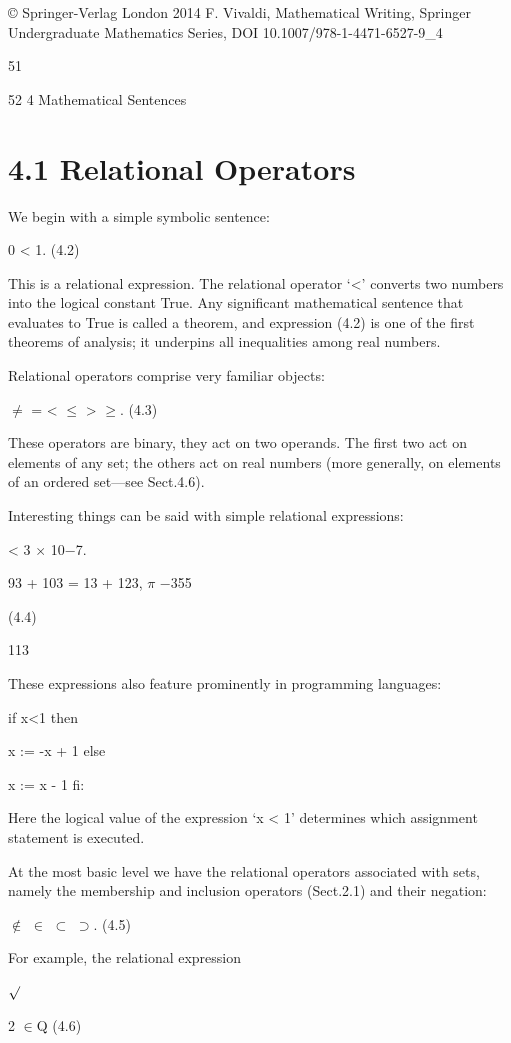 \documentclass[11pt]{article}
\theoremstyle{plain}
\theoremstyle{definition}
\begin{document}
© Springer-Verlag London 2014 F. Vivaldi, Mathematical Writing, Springer Undergraduate Mathematics Series, DOI 10.1007/978-1-4471-6527-9\_4

51

52 4 Mathematical Sentences

\section{4.1 Relational Operators}

We begin with a simple symbolic sentence:

0 < 1. (4.2)

This is a relational expression. The relational operator `<' converts two numbers into the logical constant True. Any significant mathematical sentence that evaluates to True is called a theorem, and expression (4.2) is one of the first theorems of analysis; it underpins all inequalities among real numbers.

Relational operators comprise very familiar objects:

$\neq$ = < $\leq$ > $\geq$. (4.3)

These operators are binary, they act on two operands. The first two act on elements of any set; the others act on real numbers (more generally, on elements of an ordered set---see Sect.4.6).

Interesting things can be said with simple relational expressions:

< 3 $\times$ 10$-$7.

93 + 103 = 13 + 123, $\pi$ $-$355

(4.4)

113

These expressions also feature prominently in programming languages:

if x<1 then

x := -x + 1 else

x := x - 1 fi:

Here the logical value of the expression `x < 1' determines which assignment statement is executed.

At the most basic level we have the relational operators associated with sets, namely the membership and inclusion operators (Sect.2.1) and their negation:

$\notin$ $\in$  $\subset$  $\supset$. (4.5)

For example, the relational expression

$\surd$

2 $\in$Q (4.6)
\end{document}
